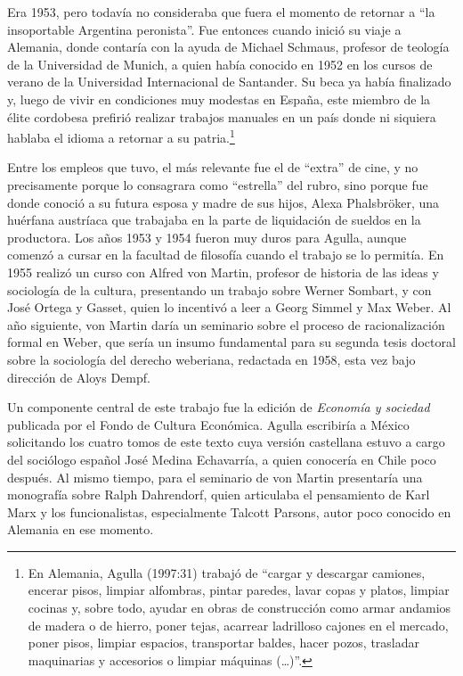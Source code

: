 Era 1953, pero todavía no consideraba que fuera el momento de retornar a ``la insoportable Argentina peronista''. Fue entonces cuando inició su viaje a Alemania, donde contaría con la ayuda de Michael Schmaus, profesor de teología de la Universidad de Munich, a quien había conocido en 1952 en los cursos de verano de la Universidad Internacional de Santander. Su beca ya había finalizado y, luego de vivir en condiciones muy modestas en España, este miembro de la élite cordobesa prefirió realizar trabajos manuales en un país donde ni siquiera hablaba el idioma a retornar a su patria.\footnote{En Alemania, Agulla (1997:31) trabajó de ``cargar y descargar camiones, encerar pisos, limpiar alfombras, pintar paredes, lavar copas y platos, limpiar cocinas y, sobre todo, ayudar en obras de construcción como armar andamios de madera o de hierro, poner tejas, acarrear ladrilloso cajones en el mercado, poner pisos, limpiar espacios, transportar baldes, hacer pozos, trasladar maquinarias y accesorios o limpiar máquinas (\dots)''.}

Entre los empleos que tuvo, el más relevante fue el de ``extra'' de cine, y no precisamente porque lo consagrara como ``estrella'' del rubro, sino porque fue donde conoció a su futura esposa y madre de sus hijos, Alexa Phalsbröker, una huérfana austríaca que trabajaba en la parte de liquidación de sueldos en la productora. Los años 1953 y 1954 fueron muy duros para Agulla, aunque comenzó a cursar en la facultad de filosofía cuando el trabajo se lo permitía. En 1955 realizó un curso con Alfred von Martin, profesor de historia de las ideas y sociología de la cultura, presentando un trabajo sobre Werner Sombart, y con José Ortega y Gasset, quien lo incentivó a leer a Georg Simmel y Max Weber. Al año siguiente, von Martin daría un seminario sobre el proceso de racionalización formal en Weber, que sería un insumo fundamental para su segunda tesis doctoral sobre la sociología del derecho weberiana, redactada en 1958, esta vez bajo dirección de Aloys Dempf.

Un componente central de este trabajo fue la edición de \emph{Economía y sociedad} publicada por el Fondo de Cultura Económica. Agulla escribiría a México solicitando los cuatro tomos de este texto cuya versión castellana estuvo a cargo del sociólogo español José Medina Echavarría, a quien conocería en Chile poco después. Al mismo tiempo, para el seminario de von Martin presentaría una monografía sobre Ralph Dahrendorf, quien articulaba el pensamiento de Karl Marx y los funcionalistas, especialmente Talcott Parsons, autor poco conocido en Alemania en ese momento.

